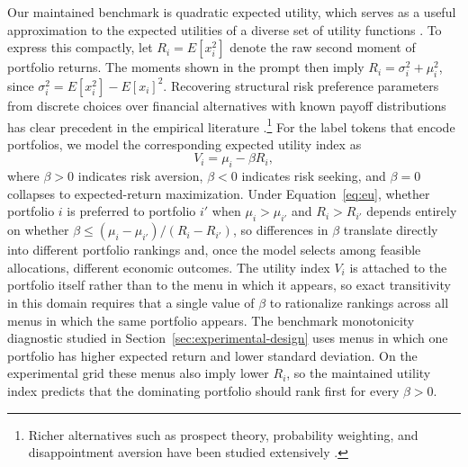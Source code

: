 Our maintained benchmark is quadratic expected utility, which serves as a useful approximation to the expected utilities of a diverse set of utility functions \citep{markowitz2014mean}. To express this compactly, let $R_i = E[x_i^2]$ denote the raw second moment of portfolio returns. The moments shown in the prompt then imply $R_i = \sigma_i^2 + \mu_i^2$, since $\sigma_i^2 = E[x_i^2] - E[x_i]^2$. Recovering structural risk preference parameters from discrete choices over financial alternatives with known payoff distributions has clear precedent in the empirical literature \citep{mester1996study, choi2007consistency, cohen2007estimating}.\footnote{Richer alternatives such as prospect theory, probability weighting, and disappointment aversion have been studied extensively \citep{kahneman1979prospect, gul1991theory, prelec1998probability, bruhin2010risk}.} For the label tokens that encode portfolios, we model the corresponding expected utility index as
\begin{equation}\label{eq:eu}
  V_i = \mu_i - \beta R_i,
\end{equation}
where $\beta > 0$ indicates risk aversion, $\beta < 0$ indicates risk seeking, and $\beta = 0$ collapses to expected-return maximization. Under Equation~\eqref{eq:eu}, whether portfolio $i$ is preferred to portfolio $i'$ when $\mu_i > \mu_{i'}$ and $R_i > R_{i'}$ depends entirely on whether $\beta \leq (\mu_i - \mu_{i'})/(R_i - R_{i'})$, so differences in $\beta$ translate directly into different portfolio rankings and, once the model selects among feasible allocations, different economic outcomes. The utility index $V_i$ is attached to the portfolio itself rather than to the menu in which it appears, so exact transitivity in this domain requires that a single value of $\beta$ to rationalize rankings across all menus in which the same portfolio appears. The benchmark monotonicity diagnostic studied in Section~\ref{sec:experimental-design} uses menus in which one portfolio has higher expected return and lower standard deviation. On the experimental grid these menus also imply lower $R_i$, so the maintained utility index predicts that the dominating portfolio should rank first for every $\beta > 0$.

